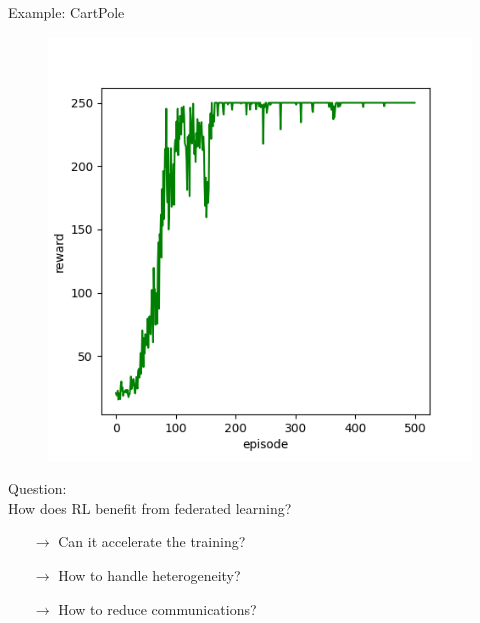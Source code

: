 \documentclass[12pt,aspectratio=169]{beamer}
\begin{document}
\begin{frame}{Example: CartPole}
\begin{figure}
{}
    \includegraphics[width=0.35\linewidth]{images/CartPole10.png}
    \label{fig:enter-label}
  \end{figure}

\end{frame}


\begin{frame}
  \begin{center}
    \textcolor{amaranth}{
      \huge Question: \\[1em]
      \LARGE How does RL benefit from federated learning?
    }

    \vspace{2em}

    \pause

  \begin{itemize} \Large
  \item[$\rightarrow$] Can it accelerate the training?
  \item[$\rightarrow$] How to handle heterogeneity?
  \item[$\rightarrow$] How to reduce communications?
  \end{itemize}
  \end{center}

\end{frame}
\end{document}

